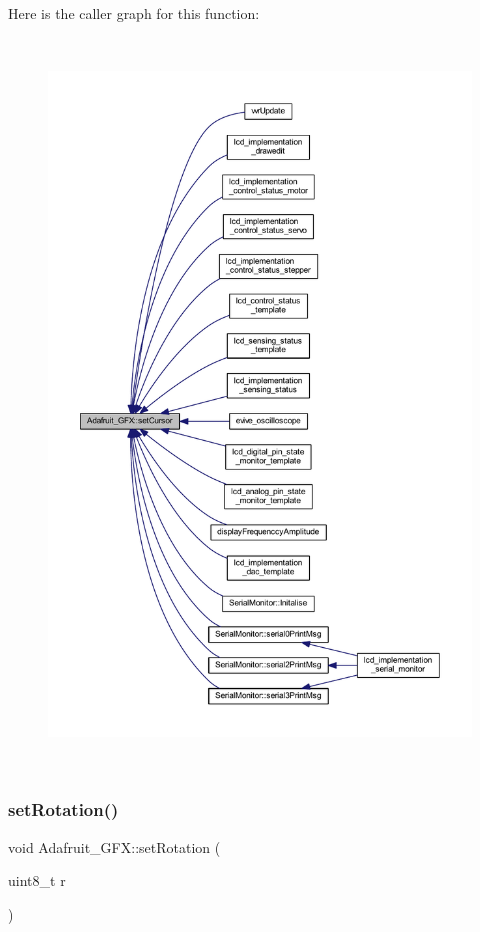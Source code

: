 Here is the caller graph for this function\+:
\nopagebreak
\begin{figure}[H]
\begin{center}
\leavevmode
\includegraphics[height=550pt]{d9/d97/class_adafruit___g_f_x_aaf96a40cad0f34dd8ec73494b3866c33_icgraph}
\end{center}
\end{figure}
\mbox{\label{class_adafruit___g_f_x_a6ac337c49876cee23ed062a928724675}} 
\subsubsection{\texorpdfstring{set\+Rotation()}{setRotation()}}
{\footnotesize\ttfamily void Adafruit\+\_\+\+G\+F\+X\+::set\+Rotation (\begin{DoxyParamCaption}\item[{uint8\+\_\+t}]{r }\end{DoxyParamCaption})}

